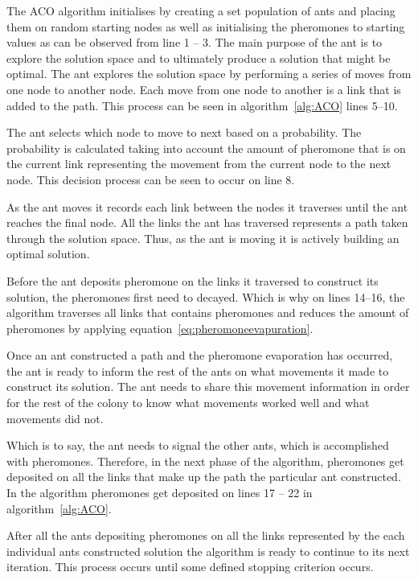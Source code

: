 The ACO algorithm initialises by creating a set population of ants and placing them on random starting nodes as well as initialising the pheromones to starting values as can be observed from line 1 -- 3. The main purpose of the ant is to explore the solution space and to ultimately produce a solution that might be optimal. The ant explores the solution space by performing a series of moves from one node to another node. Each move from one node to another is a link that is added to the path. This process can be seen in algorithm~\ref{alg:ACO} lines 5--10.

The ant selects which node to move to next based on a probability. The probability is calculated taking into account the amount of pheromone that is on the current link representing the movement from the current node to the next node\cite{CompuIntelligenceIntro,FundamentalSwarm}. This decision process can be seen to occur on line 8.

As the ant moves it records each link between the nodes it traverses until the ant reaches the final node. All the links the ant has traversed represents a path taken through the solution space\cite{CompuIntelligenceIntro,FundamentalSwarm}. Thus, as the ant is moving it is actively building an optimal solution.

Before the ant deposits pheromone on the links it traversed to construct its solution, the pheromones first need to decayed. Which is why on lines 14--16, the algorithm traverses all links that contains pheromones and reduces the amount of pheromones by applying equation~\ref{eq:pheromoneevapuration}.

Once an ant constructed a path and the pheromone evaporation has occurred, the ant is ready to inform the rest of the ants on what movements it made to construct its solution. The ant needs to share this movement information in order for the rest of the colony to know what movements worked well and what movements did not.

Which is to say, the ant needs to signal the other ants, which is accomplished with pheromones. Therefore, in the next phase of the algorithm, pheromones get deposited on all the links that make up the path the particular ant constructed. In the algorithm pheromones get deposited on lines 17 -- 22 in algorithm~\ref{alg:ACO}.

After all the ants depositing pheromones on all the links represented by the each individual ants constructed solution the algorithm is ready to continue to its next iteration. This process occurs until some defined stopping criterion occurs.

